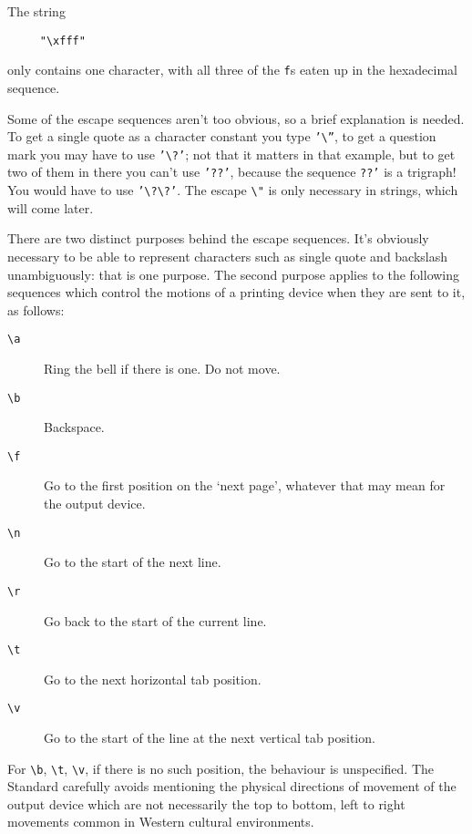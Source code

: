    The string


   \begin{Verbatim}
     "\xfff"
   \end{Verbatim}

   only contains one character, with all three of the \texttt{f}s
   eaten up in the hexadecimal sequence.


   Some of the escape sequences aren't too obvious, so a brief explanation
    is needed. To get a single quote as a character constant you
    type \texttt{'\textbackslash''}, to get a question mark you may have to
    use \texttt{'\textbackslash?'}; not that it matters in that example, but to
    get two of them in there you can't use \texttt{'??'}, because the
    sequence \texttt{??'} is a trigraph! You would have to
    use \texttt{'\textbackslash?\textbackslash?'}.
    The escape \texttt{\textbackslash"} is only
    necessary in strings, which will come later.


   There are two distinct purposes behind the escape sequences. It's
    obviously necessary to be able to represent characters such as single
    quote and backslash unambiguously: that is one purpose. The second purpose
    applies to the following sequences which control the motions of a printing
    device when they are sent to it, as follows:


   \begin{description}
    \item[\texttt{\textbackslash a}] Ring the bell if there is one. Do not move.
    \item[\texttt{\textbackslash b}] Backspace.
    \item[\texttt{\textbackslash f}] Go to the first position on the `next page', whatever that may
     mean for the output device.
    \item[\texttt{\textbackslash n}] Go to the start of the next line.
    \item[\texttt{\textbackslash r}] Go back to the start of the current line.
    \item[\texttt{\textbackslash t}] Go to the next horizontal tab position.
    \item[\texttt{\textbackslash v}] Go to the start of the line at the next vertical tab position.
   \end{description}

   For \texttt{\textbackslash b}, \texttt{\textbackslash t},
   \texttt{\textbackslash v}, if there is
    no such position, the behaviour is unspecified. The Standard carefully
    avoids mentioning the physical directions of movement of the output device
    which are not necessarily the top to bottom, left to right movements
    common in Western cultural environments.



